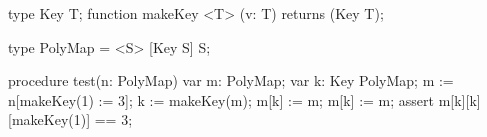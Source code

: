 type Key T;
function makeKey <T> (v: T) returns (Key T);

type PolyMap = <S> [Key S] S;

procedure test(n: PolyMap) {
    var m: PolyMap;
    var k: Key PolyMap;
    m := n[makeKey(1) := 3];
    k := makeKey(m);
    m[k] := m;   
    m[k] := m;
    assert m[k][k][makeKey(1)] == 3;
}